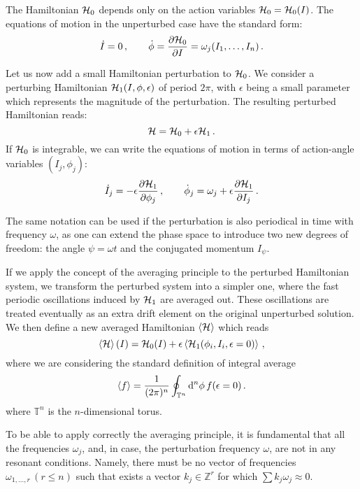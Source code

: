 The Hamiltonian $\mathcal{H}_0$ depends only on the action variables $\mathcal{H}_0=\mathcal{H}_0(I)$. The equations of motion in the unperturbed case have the standard form:
\begin{equation}
    \dot{I}=0\,, \qquad \dot{\phi} = \pdv{\mathcal{H}_0}{I} = \omega_j(I_1,\dots,I_n) \,.
\end{equation}

Let us now add a small Hamiltonian perturbation to $\mathcal{H}_0$. We consider a perturbing Hamiltonian $\mathcal{H}_1(I, \phi, \epsilon)$ of period $2\pi$, with $\epsilon$ being a small parameter which represents the magnitude of the perturbation. The resulting perturbed Hamiltonian reads:
\begin{equation}
    \mathcal{H} = \mathcal{H}_0 + \epsilon \mathcal{H}_1\,.
\end{equation}
%
If $\mathcal{H}_0$ is integrable, we can write the equations of motion in terms of action-angle variables $(I_j,\phi_j)$:
%
\begin{equation}
    \dot I_j = -\epsilon \pdv{\mathcal{H}_1}{\phi_j}\,,\qquad
	\dot \phi_j = \omega_j + \epsilon \pdv{\mathcal{H}_1}{I_j}\, .
\end{equation}
%

The same notation can be used if the perturbation is also periodical in time with frequency $\omega$, as one can extend the phase space to introduce two new degrees of freedom: the angle $\psi=\omega t$ and the conjugated momentum $I_\psi$.

If we apply the concept of the averaging principle to the perturbed Hamiltonian system, we transform the perturbed system into a simpler one, where the fast periodic oscillations induced by $\mathcal{H}_1$ are averaged out. These oscillations are treated eventually as an extra drift element on the original unperturbed solution. We then define a new averaged Hamiltonian $\left<{\mathcal{H}}\right>$ which reads
%
\begin{equation} 
	\left<{\mathcal{H}}\right>(I) = \mathcal{H}_0(I)+\epsilon \left<{ \mathcal{H}_1(\phi_i, I_i, \epsilon=0) }\right>\,,
\end{equation}
%
where we are considering the standard definition of integral average
%
\begin{equation} 
	\left<{f}\right> = \frac{1}{(2\pi)^n}\oint_{\mathbb{T}^n}\dd^n\phi\, f(\epsilon=0) \, .
\end{equation}
%
where $\mathbb{T}^n$ is the $n$-dimensional torus.

To be able to apply correctly the averaging principle, it is fundamental that all the frequencies $\omega_j$, and, in case, the perturbation frequency $\omega$, are not in any resonant conditions. Namely, there must be no vector of frequencies $\omega_{1,\ldots,r}\,(r\leq n)$ such that exists a vector $k_j \in \mathbb{Z}^r$ for which $\sum k_j \omega_j \approx 0$.

